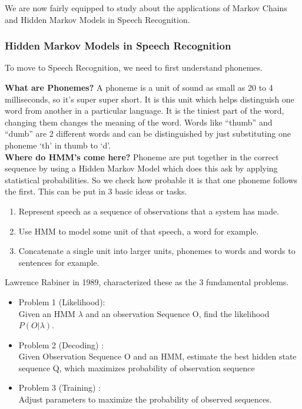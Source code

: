 \documentclass[10pt,twocolumn,letterpaper]{article}
\begin{document}
We are now fairly equipped to study about the applications of Markov Chains and Hidden Markov Models in Speech Recognition. 


\subsubsection{Hidden Markov Models in Speech Recognition}
To move to Speech Recognition, we need to first understand phonemes.


\textbf{What are Phonemes?}
A phoneme is a unit of sound as small as 20 to 4 milliseconds, so it’s super super short. It is this unit which helps distinguish one word from another in a particular language. It is the tiniest part of the word, changing them changes the meaning of the word. Words like “thumb” and “dumb” are 2 different words and can be distinguished by just substituting one phoneme ‘th’ in thumb to ‘d’. \\

\textbf{Where do HMM's come here?}
Phoneme are put together in the correct sequence by using a Hidden Markov Model which does this ask by applying statistical probabilities. So we check how probable it is that one phoneme follows the first.  This can be put in 3 basic ideas or tasks.

\begin{enumerate}
    \item Represent speech as a sequence of observations that a system has made.
    \item Use HMM to model some unit of that speech, a word for example.
    \item Concatenate a single unit into larger units, phonemes to words and words to sentences for example.
\end{enumerate}

Lawrence Rabiner in 1989, characterized these as the 3 fundamental problems.
\begin{itemize}
    \item Problem 1 (Likelihood):\\ Given an HMM $\lambda$ and an observation Sequence O, find the likelihood $P(O|\lambda)$. 
    \item Problem 2 (Decoding) : \\
    Given Observation Sequence O and an HMM, estimate the best hidden state sequence Q, which maximizes probability of observation sequence 
    \item Problem 3 (Training) : \\
    Adjust parameters to maximize the probability of observed sequences.
\end{itemize}
\end{document}
